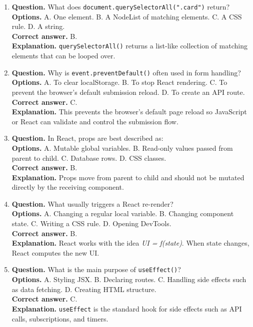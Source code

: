 \documentclass[11pt,a4paper]{article}
\begin{document}
\begin{enumerate}
  \item \textbf{Question.} What does \texttt{document.querySelectorAll(".card")} return?\\
  \textbf{Options.} A. One element. B. A NodeList of matching elements. C. A CSS rule. D. A string.\\
  \textbf{Correct answer.} B.\\
  \textbf{Explanation.} \texttt{querySelectorAll()} returns a list-like collection of matching elements that can be looped over.

  \item \textbf{Question.} Why is \texttt{event.preventDefault()} often used in form handling?\\
  \textbf{Options.} A. To clear localStorage. B. To stop React rendering. C. To prevent the browser's default submission reload. D. To create an API route.\\
  \textbf{Correct answer.} C.\\
  \textbf{Explanation.} This prevents the browser's default page reload so JavaScript or React can validate and control the submission flow.

  \item \textbf{Question.} In React, props are best described as: \\
  \textbf{Options.} A. Mutable global variables. B. Read-only values passed from parent to child. C. Database rows. D. CSS classes.\\
  \textbf{Correct answer.} B.\\
  \textbf{Explanation.} Props move from parent to child and should not be mutated directly by the receiving component.

  \item \textbf{Question.} What usually triggers a React re-render?\\
  \textbf{Options.} A. Changing a regular local variable. B. Changing component state. C. Writing a CSS rule. D. Opening DevTools.\\
  \textbf{Correct answer.} B.\\
  \textbf{Explanation.} React works with the idea \emph{UI = f(state)}. When state changes, React computes the new UI.

  \item \textbf{Question.} What is the main purpose of \texttt{useEffect()}?\\
  \textbf{Options.} A. Styling JSX. B. Declaring routes. C. Handling side effects such as data fetching. D. Creating HTML structure.\\
  \textbf{Correct answer.} C.\\
  \textbf{Explanation.} \texttt{useEffect} is the standard hook for side effects such as API calls, subscriptions, and timers.
\end{enumerate}
\end{document}

